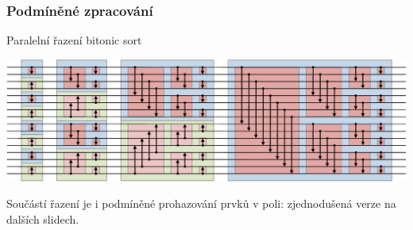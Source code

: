 \documentclass[usenames,dvipsnames,9pt]{beamer}
\begin{document}
\begin{frame}
    \frametitle{Podmíněné zpracování}
    Paralelní řazení bitonic sort
    \vspace{0.5em}
    \begin{center}
        \includegraphics[width=\linewidth]{07/figs/bitonic.pdf}
    \end{center}
    \vspace{0.5em}
    Součástí řazení je i podmíněné prohazování prvků v poli: zjednodušená verze na dalších slidech.
\end{frame}
\end{document}
